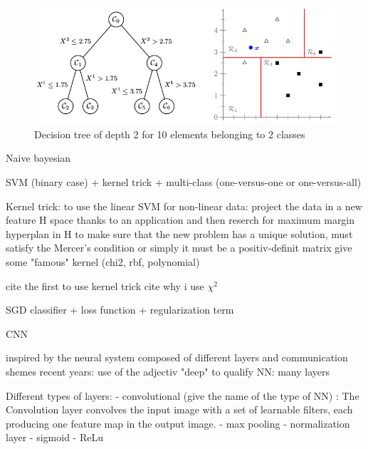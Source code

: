 \begin{figure}[h]
    \includegraphics[scale=0.5]{img/decision_tree_simple_example}
    \caption{Decision tree of depth 2 for 10 elements belonging to 2 classes}
    \label{fig:decision_tree_simple_example}
\end{figure}


Naive bayesian

SVM (binary case) + kernel trick + multi-class (one-versus-one or one-versus-all)

Kernel trick:
to use the linear SVM for non-linear data: project the data in a new feature H space thanks to an application and then reserch for maximum margin hyperplan in H
to make sure that the new problem has a unique solution, 
must satisfy the Mercer's condition or simply it must be a positiv-definit matrix
give some "famous" kernel (chi2, rbf, polynomial)

cite the first to use kernel trick
cite why i use $\chi^2$

SGD classifier + loss function + regularization term%

CNN

inspired by the neural system composed of different layers and communication shemes
recent years: use of the adjectiv "deep" to qualify NN: many layers

Different types of layers:
- convolutional (give the name of the type of NN) : The Convolution layer convolves the input image with a set of learnable filters, each producing one feature map in the output image.
- max pooling
- normalization layer %
- sigmoid
- ReLu